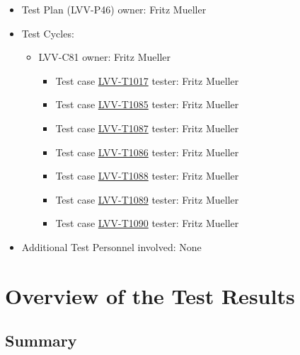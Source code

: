 \documentclass[DM,lsstdraft,STR,toc]{lsstdoc}
\begin{document}
\begin{itemize}
\item Test Plan (LVV-P46) owner: Fritz Mueller
\item Test Cycles:
\begin{itemize}
  \item LVV-C81 owner: 
    Fritz Mueller
  \begin{itemize}
    \item Test case \href{https://jira.lsstcorp.org/secure/Tests.jspa#/testCase/LVV-T1017}{LVV-T1017} tester: Fritz Mueller
    \item Test case \href{https://jira.lsstcorp.org/secure/Tests.jspa#/testCase/LVV-T1085}{LVV-T1085} tester: Fritz Mueller
    \item Test case \href{https://jira.lsstcorp.org/secure/Tests.jspa#/testCase/LVV-T1087}{LVV-T1087} tester: Fritz Mueller
    \item Test case \href{https://jira.lsstcorp.org/secure/Tests.jspa#/testCase/LVV-T1086}{LVV-T1086} tester: Fritz Mueller
    \item Test case \href{https://jira.lsstcorp.org/secure/Tests.jspa#/testCase/LVV-T1088}{LVV-T1088} tester: Fritz Mueller
    \item Test case \href{https://jira.lsstcorp.org/secure/Tests.jspa#/testCase/LVV-T1089}{LVV-T1089} tester: Fritz Mueller
    \item Test case \href{https://jira.lsstcorp.org/secure/Tests.jspa#/testCase/LVV-T1090}{LVV-T1090} tester: Fritz Mueller
  \end{itemize}
\end{itemize}
\item Additional Test Personnel involved: None
\end{itemize}

\newpage

\section{Overview of the Test Results}
\label{sect:overview}

\subsection{Summary}
\label{sect:summarytable}
\end{document}
